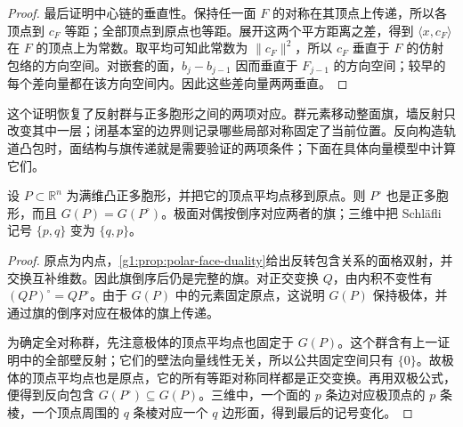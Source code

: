 \begin{proof}
	最后证明中心链的垂直性。保持任一面 \(F\) 的对称在其顶点上传递，所以各顶点到 \(c_F\) 等距；全部顶点到原点也等距。展开这两个平方距离之差，得到 \(\langle x,c_F\rangle\) 在 \(F\) 的顶点上为常数。取平均可知此常数为 \(\lVert c_F\rVert^2\)，所以 \(c_F\) 垂直于 \(F\) 的仿射包络的方向空间。对嵌套的面，\(b_j-b_{j-1}\) 因而垂直于 \(F_{j-1}\) 的方向空间；较早的每个差向量都在该方向空间内。因此这些差向量两两垂直。
\end{proof}

这个证明恢复了反射群与正多胞形之间的两项对应。群元素移动整面旗，墙反射只改变其中一层；闭基本室的边界则记录哪些局部对称固定了当前位置。反向构造轨道凸包时，面结构与旗传递就是需要验证的两项条件；下面在具体向量模型中计算它们。

\begin{proposition}
	\label{g1:prop:regular-polar-duality}
	设 \(P\subset\mathbb R^n\) 为满维凸正多胞形，并把它的顶点平均点移到原点。则 \(P^\circ\) 也是正多胞形，而且 \(G(P)=G(P^\circ)\)。极面对偶按倒序对应两者的旗；三维中把 Schläfli 记号 \(\{p,q\}\) 变为 \(\{q,p\}\)。
\end{proposition}
\begin{proof}
	原点为内点，\cref{g1:prop:polar-face-duality}给出反转包含关系的面格双射，并交换互补维数。因此旗倒序后仍是完整的旗。对正交变换 \(Q\)，由内积不变性有 \((QP)^\circ=QP^\circ\)。由于 \(G(P)\) 中的元素固定原点，这说明 \(G(P)\) 保持极体，并通过旗的倒序对应在极体的旗上传递。

	为确定全对称群，先注意极体的顶点平均点也固定于 \(G(P)\)。这个群含有上一证明中的全部壁反射；它们的壁法向量线性无关，所以公共固定空间只有 \(\{0\}\)。故极体的顶点平均点也是原点，它的所有等距对称同样都是正交变换。再用双极公式，便得到反向包含 \(G(P^\circ)\subseteq G(P)\)。三维中，一个面的 \(p\) 条边对应极顶点的 \(p\) 条棱，一个顶点周围的 \(q\) 条棱对应一个 \(q\) 边形面，得到最后的记号变化。
\end{proof}

